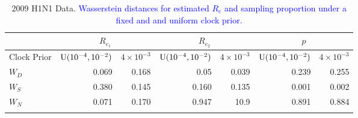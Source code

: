 \documentclass{article}
\begin{document}
\begin{table}[H]
\centering
\caption{2009 H1N1 Data. \textcolor{blue}{Wasserstein distances for estimated $R_e$ and sampling proportion under a fixed and and uniform clock prior.}}
\begin{tabular}{lrrrrrr}
\midrule
& \multicolumn{2}{c}{\textbf{$R_{e_1}$}} & \multicolumn{2}{|c|}{\textbf{$R_{e_2}$}} &
\multicolumn{2}{c}{\textbf{$p$}}\\
\midrule
Clock Prior  & $\textnormal{U}(10^{-4}, 10^{-2})$ & $4\times10^{-3}$ & $\textnormal{U}(10^{-4}, 10^{-2})$ & $4\times10^{-3}$ & $\textnormal{U}(10^{-4}, 10^{-2})$ & $4\times10^{-3}$ \\
\midrule
$W_{D}$   &   0.069   &  0.168   &   0.05    &  0.039  & 0.239 & 0.255 \\
$W_{S}$   &   0.380   &  0.145   &   0.160   &  0.135  & 0.001 & 0.002\\ 
$W_{N}$   &   0.071   &  0.170   &    0.947  &  10.9   & 0.891 & 0.884\\
\bottomrule 
\label{tab:h1n1Tab}
\end{tabular}
\end{table}
\end{document}
